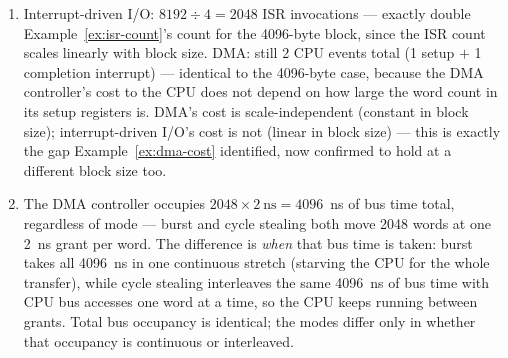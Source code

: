 \documentclass[11pt]{article}
\begin{document}
\begin{enumerate}
  \item Interrupt-driven I/O: $8192 \div 4 = 2048$ ISR invocations --- exactly double Example~\ref{ex:isr-count}'s count for the 4096-byte block, since the ISR count scales linearly with block size. DMA: still 2 CPU events total (1 setup $+$ 1 completion interrupt) --- identical to the 4096-byte case, because the DMA controller's cost to the CPU does not depend on how large the word count in its setup registers is. DMA's cost is scale-independent (constant in block size); interrupt-driven I/O's cost is not (linear in block size) --- this is exactly the gap Example~\ref{ex:dma-cost} identified, now confirmed to hold at a different block size too.
  \item The DMA controller occupies $2048 \times 2~\text{ns} = 4096$~ns of bus time total, regardless of mode --- burst and cycle stealing both move 2048 words at one 2~ns grant per word. The difference is \emph{when} that bus time is taken: burst takes all 4096~ns in one continuous stretch (starving the CPU for the whole transfer), while cycle stealing interleaves the same 4096~ns of bus time with CPU bus accesses one word at a time, so the CPU keeps running between grants. Total bus occupancy is identical; the modes differ only in whether that occupancy is continuous or interleaved.
\end{enumerate}
\endgroup



\end{document}
